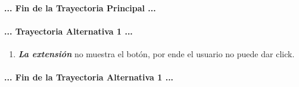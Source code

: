 \documentclass[12pt, a4paper, titlepage]{report}
\begin{document}
				\paragraph{... Fin de la Trayectoria Principal ...}
				
		        \paragraph{... Trayectoria Alternativa 1 ...}
				\begin{enumerate}
				     \item \textbf{\textit{La extensión}} no muestra el botón, por ende el usuario no puede dar click.
				\end{enumerate}
				\paragraph{... Fin de la Trayectoria Alternativa 1 ...}
				\newpage 
				
\end{document}
